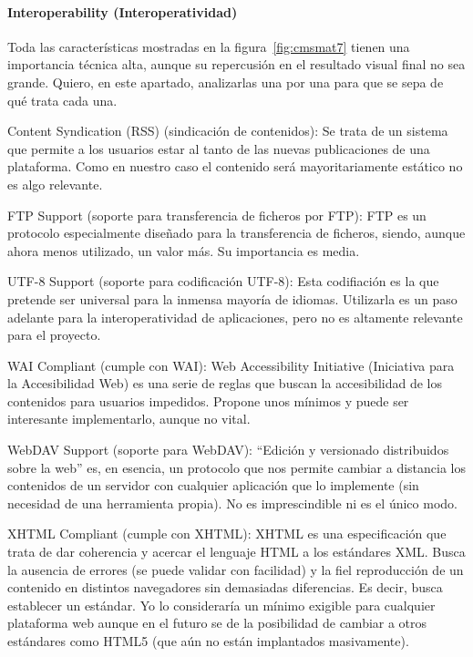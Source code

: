 \paragraph{Interoperability (Interoperatividad)}
\par Toda las características mostradas en la figura~\ref{fig:cmsmat7} tienen una importancia técnica alta, aunque su repercusión en el resultado visual final no sea grande. Quiero, en este apartado, analizarlas una por una para que se sepa de qué trata cada una.

\par Content Syndication (RSS) (sindicación de contenidos): Se trata de un sistema que permite a los usuarios estar al tanto de las nuevas publicaciones de una plataforma. Como en nuestro caso el contenido será mayoritariamente estático no es algo relevante.

\par FTP Support (soporte para transferencia de ficheros por FTP): FTP es un protocolo especialmente diseñado para la transferencia de ficheros, siendo, aunque ahora menos utilizado, un valor más. Su importancia es media.

\par UTF-8 Support (soporte para codificación UTF-8): Esta codifiación es la que pretende ser universal para la inmensa mayoría de idiomas. Utilizarla es un paso adelante para la interoperatividad de aplicaciones, pero no es altamente relevante para el proyecto.

\par WAI Compliant (cumple con WAI): Web Accessibility Initiative (Iniciativa para la Accesibilidad Web) es una serie de reglas que buscan la accesibilidad de los contenidos para usuarios impedidos. Propone unos mínimos y puede ser interesante implementarlo, aunque no vital.

\par WebDAV Support (soporte para WebDAV): ``Edición y versionado distribuidos sobre la web'' es, en esencia, un protocolo que nos permite cambiar a distancia los contenidos de un servidor con cualquier aplicación que lo implemente (sin necesidad de una herramienta propia). No es imprescindible ni es el único modo.

\par XHTML Compliant (cumple con XHTML): XHTML es una especificación que trata de dar coherencia y acercar el lenguaje HTML a los estándares XML. Busca la ausencia de errores (se puede validar con facilidad) y la fiel reproducción de un contenido en distintos navegadores sin demasiadas diferencias. Es decir, busca establecer un estándar. Yo lo consideraría un mínimo exigible para cualquier plataforma web aunque en el futuro se de la posibilidad de cambiar a otros estándares como HTML5 (que aún no están implantados masivamente).


